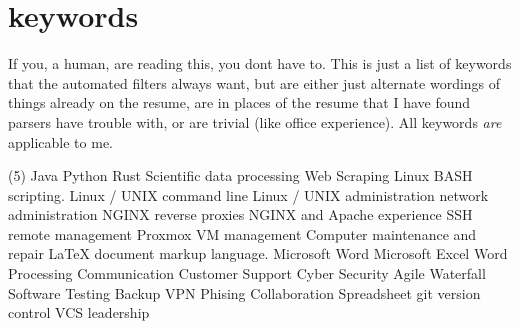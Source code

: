 \documentclass[letterpaper,10pt]{article}
\begin{document}
\section*{keywords}
	{\small
	If you, a human, are reading this, you dont have to. This is just a list of keywords that the automated filters always want, but are either just alternate wordings of things already on the resume, are in places of the resume that I have found parsers have trouble with, or are trivial (like office experience). All keywords \emph{are} applicable to me.
	\tiny
	\begin{tasks}[style=itemize](5)
			\task Java
			\task Python
			\task Rust
			\task Scientific data processing
			\task Web Scraping
			\task Linux BASH scripting.
			\task Linux / UNIX command line
			\task Linux / UNIX administration
			\task network administration
			\task NGINX reverse proxies
			\task NGINX and Apache experience
			\task SSH remote management
			\task Proxmox VM management
			\task Computer maintenance and repair
			\task LaTeX document markup language.
			\task Microsoft Word
			\task Microsoft Excel
			\task Word Processing
			\task Communication
			\task Customer Support
			\task Cyber Security
			\task Agile
			\task Waterfall
			\task Software Testing
			\task Backup
			\task VPN
			\task Phising
			\task Collaboration
			\task Spreadsheet
			\task git
			\task version control
			\task VCS
			\task leadership
	\end{tasks}
	}
\end{document}
